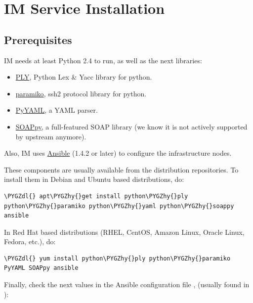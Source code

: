 \documentclass[letterpaper,10pt,english]{sphinxmanual}
\def\PYGZdl{\char`\$}
\def\PYGZhy{\char`\-}
\begin{document}
\chapter{IM Service Installation}
\label{manual::doc}\label{manual:im-service-installation}

\section{Prerequisites}
\label{manual:prerequisites}
IM needs at least Python 2.4 to run, as well as the next libraries:
\begin{itemize}
\item {} 
\href{http://www.dabeaz.com/ply/}{PLY}, Python Lex \& Yacc library for python.

\item {} 
\href{http://www.lag.net/paramiko/}{paramiko}, ssh2 protocol library for python.

\item {} 
\href{http://pyyaml.org/}{PyYAML}, a YAML parser.

\item {} 
\href{http://pywebsvcs.sourceforge.net/}{SOAPpy}, a full-featured SOAP library
(we know it is not actively supported by upstream anymore).

\end{itemize}

Also, IM uses \href{http://www.ansible.com}{Ansible} (1.4.2 or later) to configure the
infrastructure nodes.

These components are usually available from the distribution repositories. To
install them in Debian and Ubuntu based distributions, do:

\begin{Verbatim}[commandchars=\\\{\}]
\PYGZdl{} apt\PYGZhy{}get install python\PYGZhy{}ply python\PYGZhy{}paramiko python\PYGZhy{}yaml python\PYGZhy{}soappy ansible
\end{Verbatim}

In Red Hat based distributions (RHEL, CentOS, Amazon Linux, Oracle Linux,
Fedora, etc.), do:

\begin{Verbatim}[commandchars=\\\{\}]
\PYGZdl{} yum install python\PYGZhy{}ply python\PYGZhy{}paramiko PyYAML SOAPpy ansible
\end{Verbatim}

Finally, check the next values in the Ansible configuration file
, (usually found in ):
\end{document}

